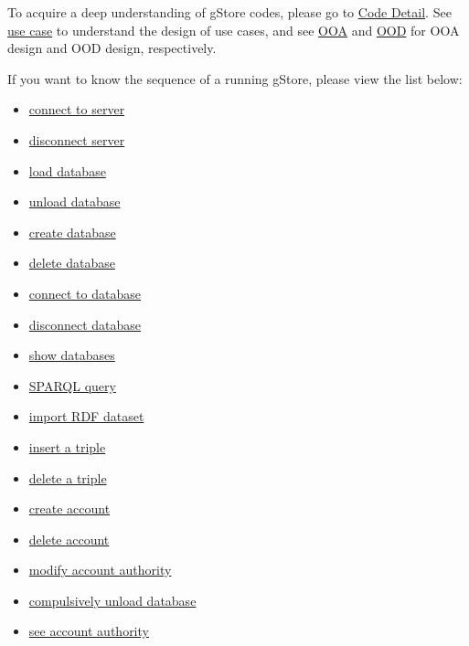 \documentclass[titlepage, a4paper, 12pt]{article}
\begin{document}

To acquire a deep understanding of gStore codes, please go to
\href{run:../pdf/code_overview.pdf}{Code
Detail}. See
\href{run:../pdf/Gstore2.0_useCaseDoc.pdf}{use
case} to understand the design of use cases, and see
\href{run:../pdf/OOA_class.pdf}{OOA}
and
\href{run:../pdf/OOD_class.pdf}{OOD}
for OOA design and OOD design, respectively.

If you want to know the sequence of a running gStore, please view the
list below:

\begin{itemize}
\item
  \href{run:../jpg/A01-connectServer.jpg}{connect
  to server}
\item
  \href{run:../jpg/A02-disconnectServer.jpg}{disconnect
  server}
\item
  \href{run:../jpg/A03-loadDatabase.jpg}{load
  database}
\item
  \href{run:../jpg/A04-unloadDatabase.jpg}{unload
  database}
\item
  \href{run:../jpg/A05-buildDatabase.jpg}{create
  database}
\item
  \href{run:../jpg/A06-deleteDatabase.jpg}{delete
  database}
\item
  \href{run:../jpg/A07-connectDatabase.jpg}{connect
  to database}
\item
  \href{run:../jpg/A08-disconnectDatabase.jpg}{disconnect
  database}
\item
  \href{run:../jpg/A09-showDatabase.jpg}{show
  databases}
\item
  \href{run:../jpg/A10-querySPARQL.jpg}{SPARQL
  query}
\item
  \href{run:../jpg/A11-loadRDF.jpg}{import
  RDF dataset}
\item
  \href{run:../jpg/A12-insertRDF.jpg}{insert
  a triple}
\item
  \href{run:../jpg/A13-deleteRDF.jpg}{delete
  a triple}
\item
  \href{run:../jpg/B01-createAccount.jpg}{create
  account}
\item
  \href{run:../jpg/B02-deleteAccount.jpg}{delete
  account}
\item
  \href{run:../jpg/B03-changeAccount.jpg}{modify
  account authority}
\item
  \href{run:../jpg/B04-removeDatabase.jpg}{compulsively
  unload database}
\item
  \href{run:../jpg/B05-showAccount.jpg}{see
  account authority}
\end{itemize}
\end{document}
